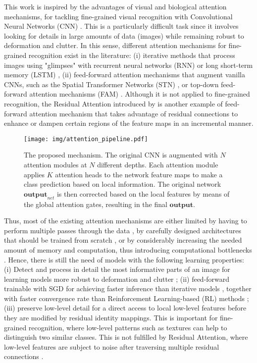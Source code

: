 \documentclass[runningheads]{llncs}
\begin{document}
This work is inspired by the advantages of visual and biological attention mechanisms, for tackling fine-grained visual recognition with Convolutional Neural Networks (CNN) \cite{lecun1998gradient}. This is a particularly difficult task since it involves looking for details in large amounts of data (images) while remaining robust to deformation and clutter. In this sense, different attention mechanisms for fine-grained recognition exist in the literature: (i) iterative methods that process images using "glimpses" with recurrent neural networks (RNN) or long short-term memory (LSTM) \cite{sermanet2014attention,zhao2017diversified}, (ii) feed-forward attention mechanisms that augment vanilla CNNs, such as the Spatial Transformer Networks (STN) \cite{jaderberg2015spatial}, or top-down feed-forward attention mechanisms (FAM) \cite{rodriguez2017age}. Although it is not applied to fine-grained recognition, the Residual Attention introduced by \cite{wang2017residual} is another example of feed-forward attention mechanism that takes advantage of residual connections \cite{he2016deep} to enhance or dampen certain regions of the feature maps in an incremental manner.


\begin{figure}[t!]
\centering 
	\texttt{[image: img/attention\_pipeline.pdf]}
\caption{The proposed mechanism. The original CNN is augmented with $N$ attention modules at $N$ different depths. Each attention module applies $K$ attention heads to the network feature maps to make a class prediction based on local information. The original network $\mathbf{output}_{net}$ is then corrected based on the local features by means of the global attention gates, resulting in the final $\mathbf{output}$. }
\label{fig:overall}
\end{figure}

Thus, most of the existing attention mechanisms are either limited by having to perform multiple passes through the data \cite{sermanet2014attention}, by carefully designed architectures that should be trained from scratch \cite{jaderberg2015spatial}, or by considerably increasing the needed amount of memory and computation, thus introducing computational bottlenecks \cite{jetley2018learn}. Hence, there is still the need of models with the following learning properties: (i) Detect and process in detail the most informative parts of an image for learning models more robust to deformation and clutter \cite{mnih2014recurrent}; (ii) feed-forward trainable with SGD for achieving faster inference than iterative models \cite{sermanet2014attention,zhao2017diversified}, together with faster convergence rate than Reinforcement Learning-based (RL) methods \cite{sermanet2014attention,liu2016fully}; (iii) preserve low-level detail for a direct access to local low-level features before they are modified by residual identity mappings. This is important for fine-grained recognition, where low-level patterns such as textures can help to distinguish two similar classes. This is not fulfilled by Residual Attention, where low-level features are subject to noise after traversing multiple residual connections \cite{wang2017residual}. 
\end{document}
